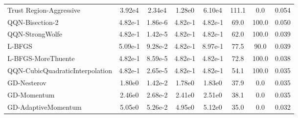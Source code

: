 \documentclass{article}
\begin{document}
\begin{table}[htbp]
{\begin{tabular}{p{2.5cm}*{7}{c}}
Trust Region-Aggressive & 3.92e4 & 2.34e4 & 1.28e0 & 6.10e4 & 111.1 & 0.0 & 0.054 \\
QQN-Bisection-2 & 4.82e-1 & 1.86e-6 & 4.82e-1 & 4.82e-1 & 69.0 & 100.0 & 0.050 \\
QQN-StrongWolfe & 4.82e-1 & 1.42e-5 & 4.82e-1 & 4.82e-1 & 62.0 & 100.0 & 0.039 \\
L-BFGS & 5.09e-1 & 9.28e-2 & 4.82e-1 & 8.97e-1 & 77.5 & 90.0 & 0.039 \\
L-BFGS-MoreThuente & 4.82e-1 & 8.59e-5 & 4.82e-1 & 4.82e-1 & 72.8 & 100.0 & 0.038 \\
QQN-CubicQuadraticInterpolation & 4.82e-1 & 2.65e-5 & 4.82e-1 & 4.82e-1 & 54.1 & 100.0 & 0.035 \\
GD-Nesterov & 1.80e0 & 1.42e-2 & 1.78e0 & 1.83e0 & 37.9 & 0.0 & 0.035 \\
GD-Momentum & 2.46e0 & 2.68e-2 & 2.41e0 & 2.51e0 & 38.1 & 0.0 & 0.035 \\
GD-AdaptiveMomentum & 5.05e0 & 5.26e-2 & 4.95e0 & 5.12e0 & 35.0 & 0.0 & 0.032 \\
\bottomrule
\end{tabular}
}
\end{table}
\end{document}
